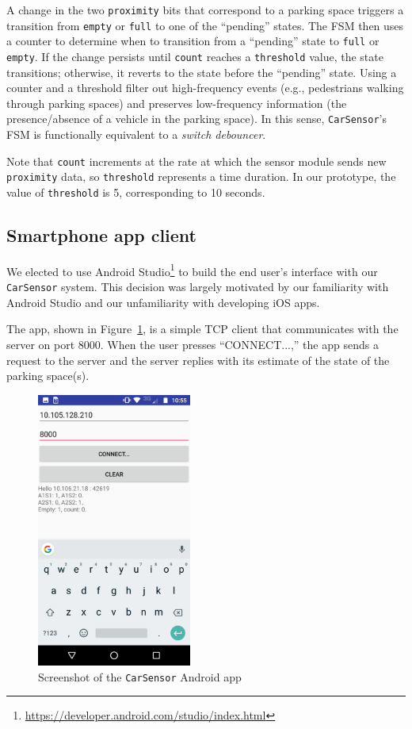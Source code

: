 \documentclass[conference]{IEEEtran}
\begin{document}
A change in the two \texttt{proximity} bits that correspond to a parking space triggers a transition from \texttt{empty} or \texttt{full} to one of the ``pending'' states. The FSM then uses a counter to determine when to transition from a ``pending'' state to \texttt{full} or \texttt{empty}. If the change persists until \texttt{count} reaches a \texttt{threshold} value, the state transitions; otherwise, it reverts to the state before the ``pending'' state. Using a counter and a threshold filter out high-frequency events (e.g., pedestrians walking through parking spaces) and preserves low-frequency information (the presence/absence of a vehicle in the parking space). In this sense, \texttt{CarSensor}'s FSM is functionally equivalent to a \textit{switch debouncer}.

Note that \texttt{count} increments at the rate at which the sensor module sends new \texttt{proximity} data, so \texttt{threshold} represents a time duration. In our prototype, the value of \texttt{threshold} is 5, corresponding to 10 seconds.
\subsection{Smartphone app client}
We elected to use Android Studio\footnote{\url{https://developer.android.com/studio/index.html}} to build the end user's interface with our \texttt{CarSensor} system. This decision was largely motivated by our familiarity with Android Studio and our unfamiliarity with developing iOS apps.

The app, shown in Figure~\ref{fig_app}, is a simple TCP client that communicates with the server on port 8000. When the user presses ``CONNECT...,'' the app sends a request to the server and the server replies with its estimate of the state of the parking space(s).

\begin{figure}[h]
	\centering
	\includegraphics[width=2.0in]{app.png}
	\caption{Screenshot of the \texttt{CarSensor} Android app}
	\label{fig_app}
\end{figure}
\end{document}

